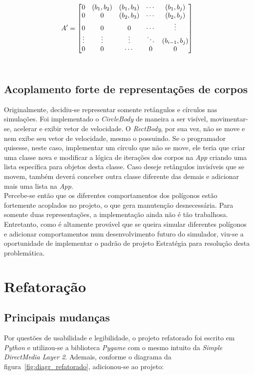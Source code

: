 \documentclass[11pt]{article}
\begin{document}
$$A'= 
\begin{bmatrix} 0 & (b_1, b_2) & (b_1, b_3) & \cdots & (b_1, b_j) \cr
0 & 0 & (b_2, b_3) & \cdots & (b_2, b_j) \cr 
0 & 0 & 0 & \cdots & \vdots \cr 
\vdots & \vdots & \vdots & \ddots & (b_{i-1}, b_j) \cr
0 & 0 & \cdots & 0 & 0 \cr 
\end{bmatrix} $$ \\

\subsection{Acoplamento forte de representações de corpos}

Originalmente, decidiu-se representar somente retângulos e círculos nas simulações. Foi implementado o \textit{CircleBody} de maneira a ser visível, movimentar-se, acelerar e exibir vetor de velocidade. O \textit{RectBody}, por sua vez, não se move e nem exibe seu vetor de velocidade, mesmo o possuindo. Se o programador quisesse, neste caso, implementar um círculo que não se move, ele teria que criar uma classe nova e modificar a lógica de iterações dos corpos na \textit{App} criando uma lista específica para objetos desta classe. Caso deseje retângulos invisíveis que se movem, também deverá conceber outra classe diferente das demais e adicionar mais uma lista na \textit{App}. \\

Percebe-se então que os diferentes comportamentos dos polígonos estão fortemente acoplados no projeto, o  que gera manutenção desnecessária. Para somente duas representações, a implementação ainda não é tão trabalhosa. Entretanto, como é altamente provável que se queira simular diferentes polígonos e adicionar comportamentos num desenvolvimento futuro do simulador, viu-se a oportunidade de implementar o padrão de projeto Estratégia para resolução desta problemática.

\section{Refatoração}

\subsection{Principais mudanças}

Por questões de usabilidade e legibilidade, o projeto refatorado foi escrito em \textit{Python} e utilizou-se a biblioteca \textit{Pygame} com o mesmo intuito da \textit{Simple DirectMedia Layer 2}. Ademais, conforme o diagrama da figura~\ref{fig:diagr_refatorado}, adicionou-se ao projeto:
\end{document}
